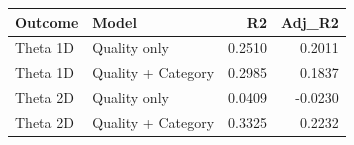 \begin{tabular}{llrr}
  \toprule
Outcome & Model & R2 & Adj\_R2 \\ 
  \midrule
Theta 1D & Quality only & 0.2510 & 0.2011 \\ 
  Theta 1D & Quality + Category & 0.2985 & 0.1837 \\ 
  Theta 2D & Quality only & 0.0409 & -0.0230 \\ 
  Theta 2D & Quality + Category & 0.3325 & 0.2232 \\ 
   \bottomrule
\end{tabular}
